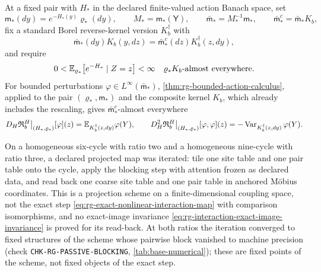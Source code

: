 At a fixed pair with \(H_*\) in the declared finite-valued action Banach space,
set
\begin{equation}
\mathsf m_*(dy)=e^{-H_*(y)}\varrho_*(dy),\qquad
M_*=\mathsf m_*(\mathsf Y),\qquad
\bar{\mathsf m}_*=M_*^{-1}\mathsf m_*,\qquad
\bar{\mathsf m}^c_*=\bar{\mathsf m}_*K_b,
\label{eq:rg-fixed-normalized-reverse-data}
\end{equation}
fix a standard Borel reverse-kernel version \(K_b^\dagger\) with
\begin{equation}
\bar{\mathsf m}_*(dy)K_b(y,dz)=\bar{\mathsf m}^c_*(dz)K_b^\dagger(z,dy),
\label{eq:rg-fixed-normalized-reverse-kernel}
\end{equation}
and require
\begin{equation}
0<\mathbb E_{\varrho_*}\bigl[e^{-H_*}\mid Z=z\bigr]<\infty
\quad\varrho_*K_b\text{-almost everywhere}.
\label{eq:rg-linearization-positive-likelihood}
\end{equation}
For bounded perturbations \(\varphi\in L^\infty(\bar{\mathsf m}_*)\),
\cref{thm:rg-bounded-action-calculus}, applied to the pair \((\varrho_*,\mathsf m_*)\) and
the composite kernel \(K_b\), which already includes the rescaling, gives
\(\bar{\mathsf m}^c_*\)-almost everywhere
\begin{equation}
D_H\mathfrak R^H_b\big|_{(H_*,\varrho_*)}[\varphi](z)
=\mathbb E_{K_b^\dagger(z,dy)}\varphi(Y),
\qquad
D_H^2\mathfrak R^H_b\big|_{(H_*,\varrho_*)}[\varphi,\varphi](z)
=-\operatorname{Var}_{K_b^\dagger(z,dy)}\varphi(Y).
\label{eq:rg-linearized-action}
\end{equation}

On a homogeneous six-cycle with ratio two and a homogeneous nine-cycle with
ratio three, a declared projected map was iterated: tile one site table and one
pair table onto the cycle, apply the blocking step with attention frozen as
declared data, and read back one coarse site table and one pair table in
anchored M\"obius coordinates. This is a projection scheme on a
finite-dimensional coupling space, not the exact step
\eqref{eq:rg-exact-nonlinear-interaction-map} with comparison isomorphisms, and
no exact-image invariance \eqref{eq:rg-interaction-exact-image-invariance} is
proved for its read-back. At both ratios the iteration converged to fixed
structures of the scheme whose pairwise block vanished to machine precision
(check \texttt{CHK-RG-PASSIVE-BLOCKING}, \cref{tab:base-numerical}); these are
fixed points of the scheme, not fixed objects of the exact step.

